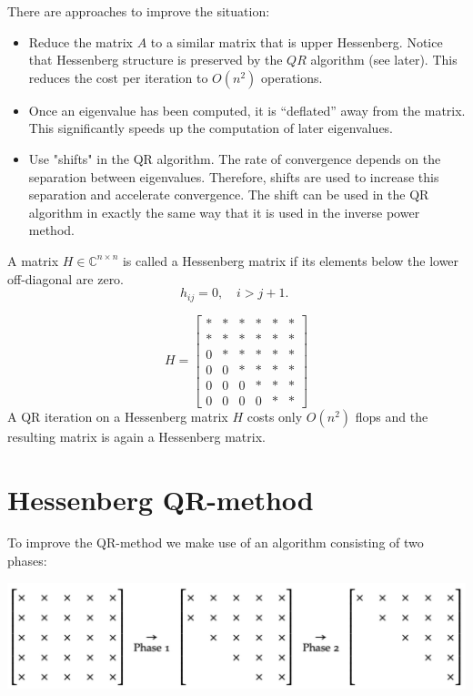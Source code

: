 \documentclass[11pt]{book}
\begin{document}
There are approaches to improve the situation:
\begin{itemize}
  \item Reduce the matrix $A$ to a similar matrix that is upper Hessenberg. Notice that Hessenberg structure is preserved by the $Q R$ algorithm (see later). This reduces the cost per iteration to $O\left(n^{2}\right)$ operations.

  \item Once an eigenvalue has been computed, it is “deflated” away from the matrix. This significantly speeds up the computation of later eigenvalues.

  \item Use "shifts" in the QR algorithm. The rate of convergence depends on the separation between eigenvalues. Therefore, shifts  are used to increase this separation and accelerate convergence. The shift can be used in the QR algorithm in exactly the same way that it is used in the inverse power method.
\end{itemize}
 A matrix $H \in \mathbb{C}^{n \times n}$ is called a Hessenberg matrix if its elements below the lower off-diagonal are zero.
$$
h_{i j}=0, \quad i>j+1 \text {. }
$$

$$
H=\left[\begin{array}{llllll}
* & * & * & * & * & * \\
* & * & * & * & * & * \\
0 & * & * & * & * & * \\
0 & 0 & * & * & * & * \\
0 & 0 & 0 & * & * & * \\
0 & 0 & 0 & 0 & * & *
\end{array}\right]
$$
A QR iteration on a Hessenberg matrix $H$ costs only $O\left(n^{2}\right)$ flops and the resulting matrix is again a Hessenberg matrix.

\section*{Hessenberg QR-method}
To improve the QR-method we make use of an algorithm consisting of two phases:
\begin{center}
\includegraphics[max width=\textwidth]{2023_09_05_b72ccc85584d9dc6fb5cg-292}
\end{center}
\end{document}
